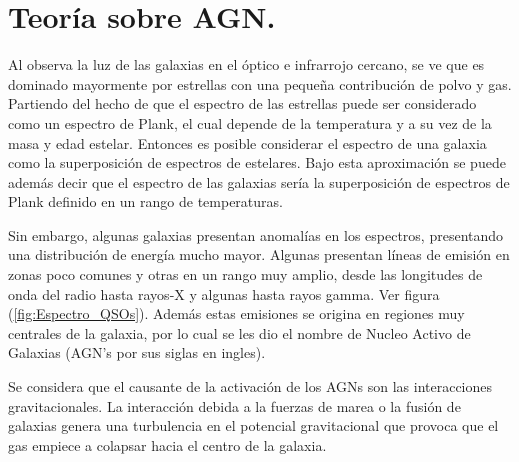 \begin{savequote}[50mm]
\end{savequote}




\chapter{Teoría sobre AGN.}
\label{cha:Theoretical Framework}


Al observa la luz de las galaxias en el óptico e infrarrojo cercano, se ve que es dominado mayormente por estrellas con una pequeña contribución de polvo y gas. Partiendo del hecho de que el espectro de las estrellas puede ser considerado como un espectro de Plank, el cual depende de la temperatura y a su vez de la masa y edad estelar. Entonces es posible considerar el espectro de una galaxia como la superposición de espectros de estelares. Bajo esta aproximación se puede además decir que el espectro de las galaxias sería la superposición de espectros de Plank definido en un rango de temperaturas.

Sin embargo, algunas galaxias presentan anomalías en los espectros,  presentando una distribución de energía mucho mayor. Algunas presentan líneas de emisión en zonas poco comunes y otras en un rango muy amplio, desde las longitudes de onda del radio hasta rayos-X y algunas hasta rayos gamma. Ver figura (\ref{fig:Espectro_QSOs}). Además estas emisiones se origina en regiones muy centrales de la galaxia, por lo cual se les dio el nombre de Nucleo Activo de Galaxias (AGN's por sus siglas en ingles).

Se considera que el causante de la activación de los AGNs son las interacciones gravitacionales. La interacción debida a la fuerzas de marea o la fusión de galaxias genera una turbulencia en el potencial gravitacional que provoca que el gas empiece a colapsar hacia el centro de la galaxia. 

